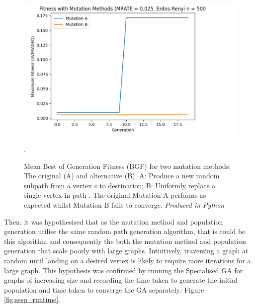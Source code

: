 \documentclass[
	a4paper, %
	10pt, %
	unnumberedsections, %
	twoside, %
]{LTJournalArticle}
\begin{document}
\begin{figure}
	\includegraphics[width=\linewidth]{Figures/sims/mutation/mutation_comparison.jpg}
	\caption{Mean Best of Generation Fitness (BGF) for two mutation methods: The original (A) and alternative (B). A: Produce a new random subpath from a vertex \(v\) to destination; B: Uniformly replace a single vertex in path . The original Mutation A performs as expected whilst Mutation B fails to converge. \emph{Produced in Python}}. 
	\label{fig:mutation_comparison}
\end{figure}

Then, it was hypothesised that as the mutation method and population generation utilise the same random path generation algorithm, that is could be this algorithm and consequently the both the mutation method and population generation that scale poorly with large graphs. Intuitively, traversing a graph at random until landing on a desired vertex is likely to require more iterations for a large graph. This hypothesis was confirmed by running the Specialised GA for graphs of increasing size and recording the time taken to generate the initial population and time taken to converge the GA separately: Figure \ref{fig:sssp_runtime}. 
\end{document}
